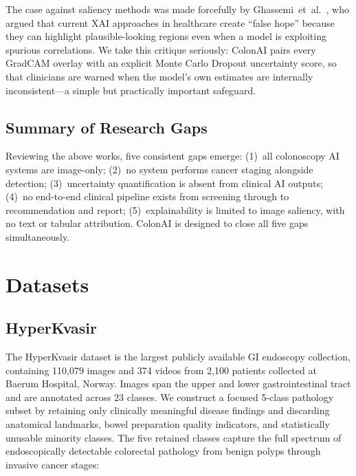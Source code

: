 \documentclass[conference]{IEEEtran}
\begin{document}
The case against saliency methods was made forcefully by Ghassemi~et~al.~\cite{ghassemi2021},
who argued that current XAI approaches in healthcare create ``false hope''
because they can highlight plausible-looking regions even when a model is
exploiting spurious correlations. We take this critique seriously: ColonAI
pairs every GradCAM overlay with an explicit Monte Carlo Dropout uncertainty
score, so that clinicians are warned when the model's own estimates are
internally inconsistent---a simple but practically important safeguard.

\subsection{Summary of Research Gaps}

Reviewing the above works, five consistent gaps emerge:
(1)~all colonoscopy AI systems are image-only;
(2)~no system performs cancer staging alongside detection;
(3)~uncertainty quantification is absent from clinical AI outputs;
(4)~no end-to-end clinical pipeline exists from screening through to
    recommendation and report;
(5)~explainability is limited to image saliency, with no text or tabular
    attribution. ColonAI is designed to close all five gaps simultaneously.

\section{Datasets}

\subsection{HyperKvasir}

The HyperKvasir dataset \cite{borgli2020} is the largest publicly available
GI endoscopy collection, containing 110,079 images and 374 videos from 2,100
patients collected at Baerum Hospital, Norway. Images span the upper and lower
gastrointestinal tract and are annotated across 23 classes. We construct a
focused 5-class pathology subset by retaining only clinically meaningful
disease findings and discarding anatomical landmarks, bowel preparation quality
indicators, and statistically unusable minority classes. The five retained
classes capture the full spectrum of endoscopically detectable colorectal
pathology from benign polyps through invasive cancer stages:
\end{document}
